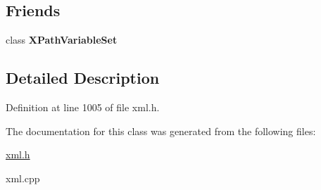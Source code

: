 \subsection*{Friends}
\begin{DoxyCompactItemize}
\item 
\hypertarget{classphys_1_1xml_1_1XPathVariable_a6d8e28205e67fa0164160dd3cb547fe6}{
class {\bfseries XPathVariableSet}}
\label{df/dee/classphys_1_1xml_1_1XPathVariable_a6d8e28205e67fa0164160dd3cb547fe6}

\end{DoxyCompactItemize}


\subsection{Detailed Description}


Definition at line 1005 of file xml.h.



The documentation for this class was generated from the following files:\begin{DoxyCompactItemize}
\item 
\hyperlink{xml_8h}{xml.h}\item 
xml.cpp\end{DoxyCompactItemize}
